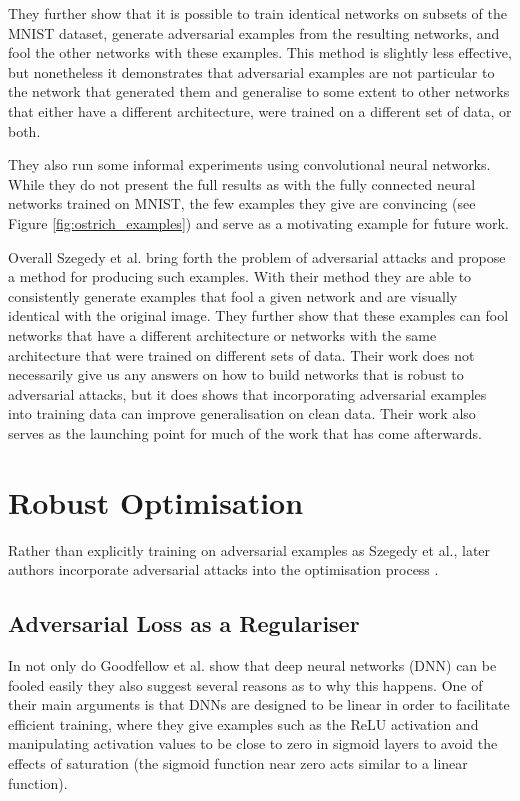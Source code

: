 \documentclass{article}
\begin{document}
They further show that it is possible to train identical networks on subsets of the MNIST dataset, generate adversarial examples from the resulting networks, and fool the other networks with these examples. This method is slightly less effective, but nonetheless it demonstrates that adversarial examples are not particular to the network that generated them and generalise to some extent to other networks that either have a different architecture, were trained on a different set of data, or both.

They also run some informal experiments using convolutional neural networks. While they do not present the full results as with the fully connected neural networks trained on MNIST, the few examples they give are convincing (see Figure \ref{fig:ostrich_examples}) and serve as a motivating example for future work.

Overall Szegedy et al. bring forth the problem of adversarial attacks and propose a method for producing such examples. With their method they are able to consistently generate examples that fool a given network and are visually identical with the original image. They further show that these examples can fool networks that have a different architecture or networks with the same architecture that were trained on different sets of data. Their work does not necessarily give us any answers on how to build networks that is robust to adversarial attacks, but it does shows that incorporating adversarial examples into training data can improve generalisation on clean data. Their work also serves as the launching point for much of the work that has come afterwards.


\section{Robust Optimisation}
Rather than explicitly training on adversarial examples as Szegedy et al., later authors incorporate adversarial attacks into the optimisation process \cite{goodfellow2014explaining, madry2017towards, schmidt2018adversarially, yan2018deep}.

\subsection{Adversarial Loss as a Regulariser}
In \cite{goodfellow2014explaining} not only do Goodfellow et al. show that deep neural networks (DNN) can be fooled easily they also suggest several reasons as to why this happens. One of their main arguments is that DNNs are designed to be linear in order to facilitate efficient training, where they give examples such as the ReLU activation and manipulating activation values to be close to zero in sigmoid layers to avoid the effects of saturation (the sigmoid function near zero acts similar to a linear function).
\end{document}
